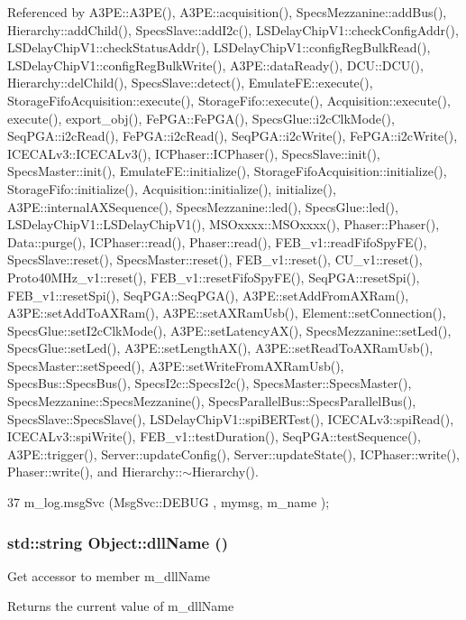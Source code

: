 Referenced by A3PE::A3PE(), A3PE::acquisition(), SpecsMezzanine::addBus(), Hierarchy::addChild(), SpecsSlave::addI2c(), LSDelayChipV1::checkConfigAddr(), LSDelayChipV1::checkStatusAddr(), LSDelayChipV1::configRegBulkRead(), LSDelayChipV1::configRegBulkWrite(), A3PE::dataReady(), DCU::DCU(), Hierarchy::delChild(), SpecsSlave::detect(), EmulateFE::execute(), StorageFifoAcquisition::execute(), StorageFifo::execute(), Acquisition::execute(), execute(), export\_\-obj(), FePGA::FePGA(), SpecsGlue::i2cClkMode(), SeqPGA::i2cRead(), FePGA::i2cRead(), SeqPGA::i2cWrite(), FePGA::i2cWrite(), ICECALv3::ICECALv3(), ICPhaser::ICPhaser(), SpecsSlave::init(), SpecsMaster::init(), EmulateFE::initialize(), StorageFifoAcquisition::initialize(), StorageFifo::initialize(), Acquisition::initialize(), initialize(), A3PE::internalAXSequence(), SpecsMezzanine::led(), SpecsGlue::led(), LSDelayChipV1::LSDelayChipV1(), MSOxxxx::MSOxxxx(), Phaser::Phaser(), Data::purge(), ICPhaser::read(), Phaser::read(), FEB\_\-v1::readFifoSpyFE(), SpecsSlave::reset(), SpecsMaster::reset(), FEB\_\-v1::reset(), CU\_\-v1::reset(), Proto40MHz\_\-v1::reset(), FEB\_\-v1::resetFifoSpyFE(), SeqPGA::resetSpi(), FEB\_\-v1::resetSpi(), SeqPGA::SeqPGA(), A3PE::setAddFromAXRam(), A3PE::setAddToAXRam(), A3PE::setAXRamUsb(), Element::setConnection(), SpecsGlue::setI2cClkMode(), A3PE::setLatencyAX(), SpecsMezzanine::setLed(), SpecsGlue::setLed(), A3PE::setLengthAX(), A3PE::setReadToAXRamUsb(), SpecsMaster::setSpeed(), A3PE::setWriteFromAXRamUsb(), SpecsBus::SpecsBus(), SpecsI2c::SpecsI2c(), SpecsMaster::SpecsMaster(), SpecsMezzanine::SpecsMezzanine(), SpecsParallelBus::SpecsParallelBus(), SpecsSlave::SpecsSlave(), LSDelayChipV1::spiBERTest(), ICECALv3::spiRead(), ICECALv3::spiWrite(), FEB\_\-v1::testDuration(), SeqPGA::testSequence(), A3PE::trigger(), Server::updateConfig(), Server::updateState(), ICPhaser::write(), Phaser::write(), and Hierarchy::$\sim$Hierarchy().


\begin{DoxyCode}
37 { m_log.msgSvc (MsgSvc::DEBUG   , mymsg, m_name ); }
\end{DoxyCode}
\hypertarget{classObject_a2e3947f2870094c332d7454117f3ec63}{
\subsubsection[{dllName}]{\setlength{\rightskip}{0pt plus 5cm}std::string Object::dllName ()}}
\label{classObject_a2e3947f2870094c332d7454117f3ec63}
Get accessor to member m\_\-dllName \begin{DoxyReturn}{Returns}
the current value of m\_\-dllName 
\end{DoxyReturn}


